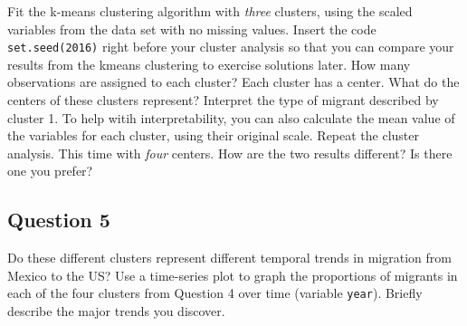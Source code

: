 \documentclass[]{article}
\begin{document}
Fit the k-means clustering algorithm with \emph{three} clusters, using
the scaled variables from the data set with no missing values. Insert
the code \texttt{set.seed(2016)} right before your cluster analysis so
that you can compare your results from the kmeans clustering to exercise
solutions later. How many observations are assigned to each cluster?
Each cluster has a center. What do the centers of these clusters
represent? Interpret the type of migrant described by cluster 1. To help
witih interpretability, you can also calculate the mean value of the
variables for each cluster, using their original scale. Repeat the
cluster analysis. This time with \emph{four} centers. How are the two
results different? Is there one you prefer?

\subsection{Question 5}\label{question-5}

Do these different clusters represent different temporal trends in
migration from Mexico to the US? Use a time-series plot to graph the
proportions of migrants in each of the four clusters from Question 4
over time (variable \texttt{year}). Briefly describe the major trends
you discover.
\end{document}
